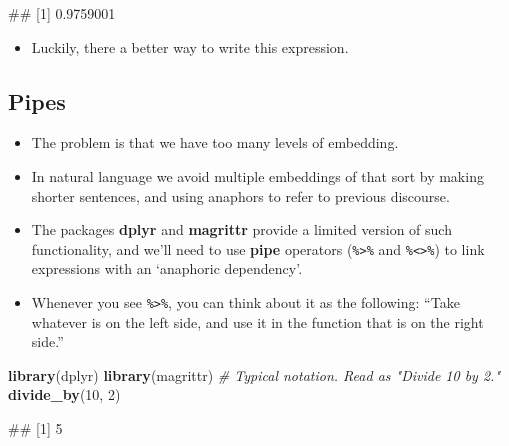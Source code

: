 \documentclass[
]{book}
\newenvironment{Shaded}{\begin{snugshade}}{\end{snugshade}}
\newcommand{\CommentTok}[1]{\textcolor[rgb]{0.56,0.35,0.01}{\textit{#1}}}
\newcommand{\DecValTok}[1]{\textcolor[rgb]{0.00,0.00,0.81}{#1}}
\newcommand{\FunctionTok}[1]{\textcolor[rgb]{0.13,0.29,0.53}{\textbf{#1}}}
\newcommand{\NormalTok}[1]{#1}
\providecommand{\tightlist}{%
  \setlength{\itemsep}{0pt}\setlength{\parskip}{0pt}}
\begin{document}
\begin{Shaded}
\begin{Highlighting}[]
\NormalTok{\#\# [1] 0.9759001}
\end{Highlighting}
\end{Shaded}

\begin{itemize}
\tightlist
\item
  Luckily, there a better way to write this expression.
\end{itemize}

\subsection{Pipes}\label{pipes-1}

\begin{itemize}
\tightlist
\item
  The problem is that we have too many levels of embedding.
\item
  In natural language we avoid multiple embeddings of that sort by making shorter sentences, and using anaphors to refer to previous discourse.
\item
  The packages \textbf{dplyr} and \textbf{magrittr} provide a limited version of such functionality, and we'll need to use \textbf{pipe} operators (\texttt{\%\textgreater{}\%} and \texttt{\%\textless{}\textgreater{}\%}) to link expressions with an `anaphoric dependency'.
\item
  Whenever you see \texttt{\%\textgreater{}\%}, you can think about it as the following: ``Take whatever is on the left side, and use it in the function that is on the right side.''
\end{itemize}

\begin{Shaded}
\begin{Highlighting}[]
\FunctionTok{library}\NormalTok{(dplyr)}
\FunctionTok{library}\NormalTok{(magrittr)}
\CommentTok{\# Typical notation. Read as "Divide 10 by 2."}
\FunctionTok{divide\_by}\NormalTok{(}\DecValTok{10}\NormalTok{, }\DecValTok{2}\NormalTok{)}
\end{Highlighting}
\end{Shaded}

\begin{Shaded}
\begin{Highlighting}[]
\NormalTok{\#\# [1] 5}
\end{Highlighting}
\end{Shaded}
\end{document}
